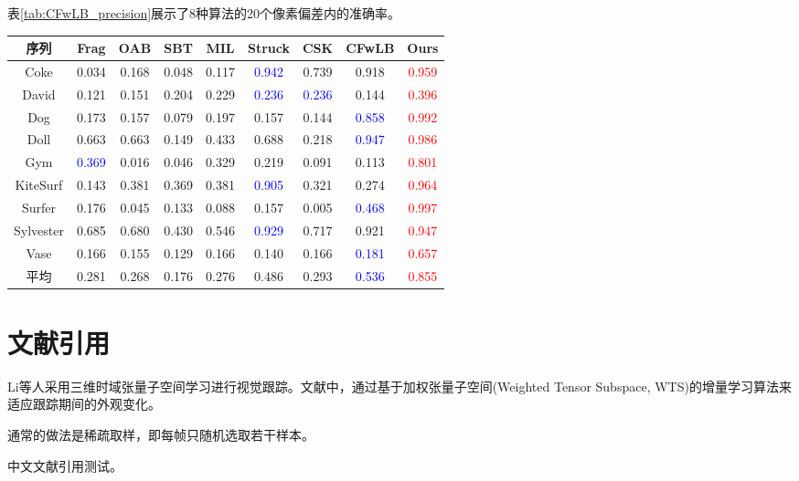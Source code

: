 表\ref{tab:CFwLB_precision}展示了8种算法的20个像素偏差内的准确率。
~\\
\begin{table*}[htbp]
\centering
\renewcommand{\arraystretch}{1.5}
\caption{8种算法20个像素偏差内的准确率}
    \begin{tabular}{|c|c|c|c|c|c|c|c|c|}
        \hline
        序列  & Frag  &  OAB  &  SBT  &  MIL  & Struck & CSK   & CFwLB   &  Ours \\ \hline

        Coke      & 0.034 & 0.168 & 0.048  & 0.117 & \textcolor{blue}{0.942} & 0.739 & 0.918   & \textcolor{red}{0.959}  \\ \hline
        David     & 0.121 & 0.151 & 0.204  & 0.229 & \textcolor{blue}{0.236} & \textcolor{blue}{0.236} & 0.144   & \textcolor{red}{0.396} \\ \hline
        Dog       & 0.173 & 0.157 & 0.079  & 0.197 & 0.157 & 0.144 & \textcolor{blue}{0.858}   & \textcolor{red}{0.992}  \\ \hline
        Doll      & 0.663 & 0.663 & 0.149  & 0.433 & 0.688 & 0.218 & \textcolor{blue}{0.947}& \textcolor{red}{ 0.986} \\ \hline
        Gym       & \textcolor{blue}{0.369} & 0.016 & 0.046  & 0.329 & 0.219 & 0.091 & 0.113   & \textcolor{red}{0.801}  \\ \hline
        KiteSurf  & 0.143 & 0.381 & 0.369  & 0.381 & \textcolor{blue}{0.905} & 0.321 & 0.274   & \textcolor{red}{0.964}  \\ \hline
        Surfer    & 0.176 & 0.045 & 0.133  & 0.088 & 0.157 & 0.005  & \textcolor{blue}{0.468}   & \textcolor{red}{0.997}  \\ \hline
    Sylvester     & 0.685 & 0.680 & 0.430  & 0.546 & \textcolor{blue}{0.929} & 0.717 & 0.921 & \textcolor{red}{0.947}\\ \hline
        Vase      & 0.166 & 0.155 & 0.129  & 0.166 & 0.140 & 0.166  & \textcolor{blue}{0.181}   & \textcolor{red}{0.657}  \\ \hline \hline

        平均      &0.281  & 0.268 & 0.176  & 0.276 & 0.486 & 0.293  & \textcolor{blue}{0.536}& \textcolor{red}{0.855} \\ \hline
\end{tabular}
\label{tab:CFwLB_precision}
\end{table*}
\setlength{\baselineskip}{20pt}


\section{文献引用}

Li等\cite{li2007robust}人采用三维时域张量子空间学习进行视觉跟踪。文献中，通过基于加权张量子空间(Weighted Tensor Subspace, WTS)的增量学习算法来适应跟踪期间的外观变化。

通常的做法是稀疏取样，即每帧只随机选取若干样本\cite{Zhang2012Real,kalal2012tracking,babenko2011robust,saffari2009line,hare2016struck}。

中文文献引用测试\cite{yuanaiping2014}。

